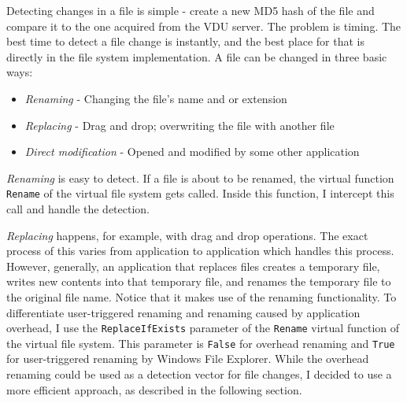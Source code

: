 Detecting changes in a file is simple - create a new MD5 hash of the file and compare it to the one acquired from the VDU server. The problem is timing. The best time to detect a file change is instantly, and the best place for that is directly in the file system implementation. A file can be changed in three basic ways:
\begin{itemize}
    \item \textit{Renaming} - Changing the file's name and or extension
    \item \textit{Replacing} - Drag and drop; overwriting the file with another file
    \item \textit{Direct modification} - Opened and modified by some other application
\end{itemize}


\textit{Renaming} is easy to detect. If a file is about to be renamed, the virtual function \lstinline{Rename} of the virtual file system gets called. Inside this function, I intercept this call and handle the detection.

\textit{Replacing} happens, for example, with drag and drop operations. The exact process of this varies from application to application which handles this process. However, generally, an application that replaces files creates a temporary file, writes new contents into that temporary file, and renames the temporary file to the original file name. Notice that it makes use of the renaming functionality. To differentiate user-triggered renaming and renaming caused by application overhead, I use the \lstinline{ReplaceIfExists} parameter of the \lstinline{Rename} virtual function of the virtual file system. This parameter is \lstinline{False} for overhead renaming and \lstinline{True} for user-triggered renaming by Windows File Explorer. While the overhead renaming could be used as a detection vector for file changes, I decided to use a more efficient approach, as described in the following section.

